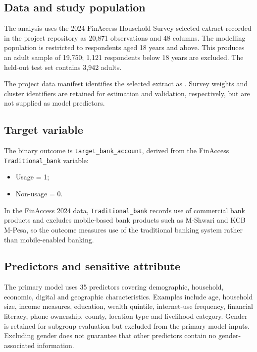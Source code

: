 \documentclass[11pt,a4paper]{article}
\begin{document}
\subsection{Data and study population}

The analysis uses the 2024 FinAccess Household Survey selected extract recorded in the project repository as 20,871 observations and 48 columns. The modelling population is restricted to respondents aged 18 years and above. This produces an adult sample of 19,750; 1,121 respondents below 18 years are excluded. The held-out test set contains 3,942 adults.

The project data manifest identifies the selected extract as . Survey weights and cluster identifiers are retained for estimation and validation, respectively, but are not supplied as model predictors.

\subsection{Target variable}

The binary outcome is \texttt{target\_bank\_account}, derived from the FinAccess \texttt{Traditional\_bank} variable:
\begin{itemize}[leftmargin=*]
  \item Usage = 1;
  \item Non-usage = 0.
\end{itemize}

In the FinAccess 2024 data, \texttt{Traditional\_bank} records use of commercial bank products and excludes mobile-based bank products such as M-Shwari and KCB M-Pesa, so the outcome measures use of the traditional banking system rather than mobile-enabled banking.

\subsection{Predictors and sensitive attribute}

The primary model uses 35 predictors covering demographic, household, economic, digital and geographic characteristics. Examples include age, household size, income measures, education, wealth quintile, internet-use frequency, financial literacy, phone ownership, county, location type and livelihood category. Gender is retained for subgroup evaluation but excluded from the primary model inputs. Excluding gender does not guarantee that other predictors contain no gender-associated information.
\end{document}
